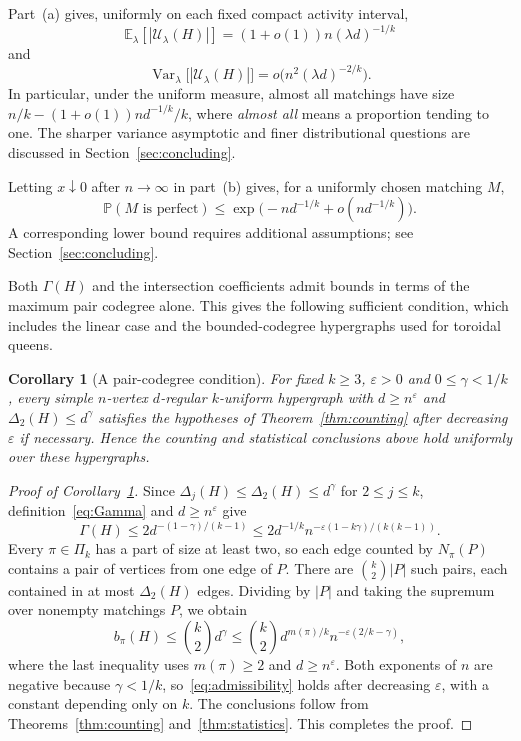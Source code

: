 \documentclass[11pt,reqno]{amsart}
\numberwithin{equation}{section}
\theoremstyle{plain}
\newtheorem{corollary}[theorem]{Corollary}
\theoremstyle{definition}
\newcommand{\E}{\mathbb E}
\newcommand{\Prob}{\mathbb P}
\newcommand{\Var}{\operatorname{Var}}
\newcommand{\eps}{\varepsilon}
\newcommand{\calU}{\mathcal U}
\begin{document}
Part~(a) gives, uniformly on each fixed compact activity interval,
\[
    \E_\lambda[|\calU_\lambda(H)|]=(1+o(1))n(\lambda d)^{-1/k}
\]
and
\[
    \Var_\lambda\bigl[|\calU_\lambda(H)|\bigr]=o\bigl(n^2(\lambda d)^{-2/k}\bigr).
\]
In particular, under the uniform measure, almost all matchings have size $n/k-(1+o(1))nd^{-1/k}/k$, where \emph{almost all} means a proportion tending to one.
The sharper variance asymptotic and finer distributional questions are discussed in Section~\ref{sec:concluding}.

Letting $x\downarrow0$ after $n\to\infty$ in part~(b) gives, for a uniformly chosen matching $M$,
\begin{equation}\label{eq:perfect-probability}
    \Prob(M\text{ is perfect})\le\exp\bigl(-nd^{-1/k}+o(nd^{-1/k})\bigr).
\end{equation}
A corresponding lower bound requires additional assumptions; see Section~\ref{sec:concluding}.

Both $\Gamma(H)$ and the intersection coefficients admit bounds in terms of the maximum pair codegree alone.
This gives the following sufficient condition, which includes the linear case and the bounded-codegree hypergraphs used for toroidal queens.

\begin{corollary}[A pair-codegree condition]\label{cor:pairrange}
    For fixed $k\ge3$, $\eps>0$ and $0\le\gamma<1/k$, every simple $n$-vertex $d$-regular $k$-uniform hypergraph with $d\ge n^\eps$ and $\Delta_2(H)\le d^\gamma$ satisfies the hypotheses of Theorem~\ref{thm:counting} after decreasing $\eps$ if necessary.
    Hence the counting and statistical conclusions above hold uniformly over these hypergraphs.
\end{corollary}

\begin{proof}[Proof of Corollary~\ref{cor:pairrange}]
    Since $\Delta_j(H)\le\Delta_2(H)\le d^\gamma$ for $2\le j\le k$, definition~\eqref{eq:Gamma} and $d\ge n^\eps$ give
    \[
        \Gamma(H)\le2d^{-(1-\gamma)/(k-1)}
        \le2d^{-1/k}n^{-\eps(1-k\gamma)/(k(k-1))}.
    \]
    Every $\pi\in\Pi_k$ has a part of size at least two, so each edge counted by $N_\pi(P)$ contains a pair of vertices from one edge of $P$.
    There are $\binom{k}{2}|P|$ such pairs, each contained in at most $\Delta_2(H)$ edges.
    Dividing by $|P|$ and taking the supremum over nonempty matchings $P$, we obtain
    \[
        b_\pi(H)\le\binom{k}{2}d^\gamma
        \le\binom{k}{2}d^{m(\pi)/k}n^{-\eps(2/k-\gamma)},
    \]
    where the last inequality uses $m(\pi)\ge2$ and $d\ge n^\eps$.
    Both exponents of $n$ are negative because $\gamma<1/k$, so~\eqref{eq:admissibility} holds after decreasing $\eps$, with a constant depending only on $k$.
    The conclusions follow from Theorems~\ref{thm:counting} and~\ref{thm:statistics}.
    This completes the proof.
\end{proof}
\end{document}
